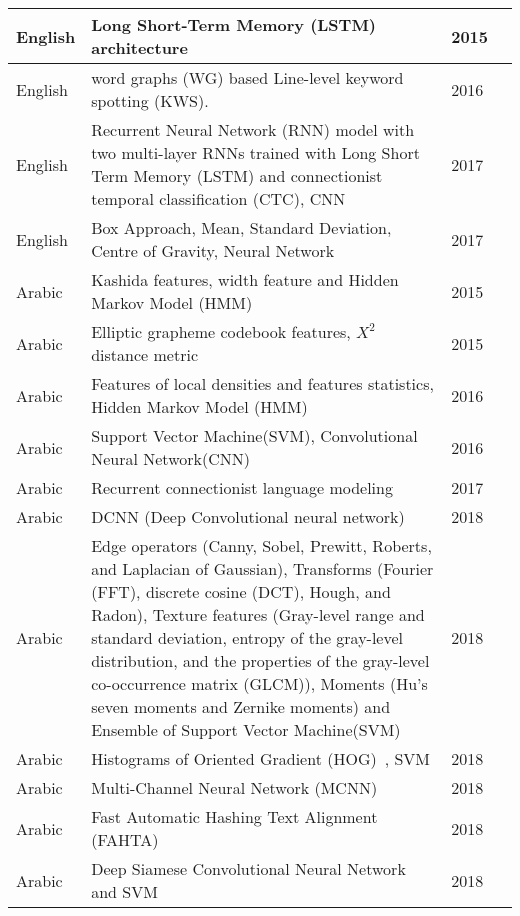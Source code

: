 \documentclass{article}
\begin{document}
\begin{landscape}
\begin{longtable}{| p{1.5cm} | p{16cm}| p{1.5cm}| p{1cm}|}
English & Long Short-Term Memory (LSTM) architecture & 2015 & \cite{gregor2015draw}\\ \hline


English & word graphs (WG) based Line-level keyword spotting (KWS). & 2016 & \cite{toselli2016hmm}\\ \hline


English & Recurrent Neural Network (RNN)  model with two multi-layer RNNs trained with Long Short Term Memory (LSTM) and connectionist temporal classification (CTC), CNN & 2017 & \cite{su2017accurate}\\ \hline
English & Box Approach, Mean, Standard Deviation, Centre of Gravity, Neural Network & 2017 & \cite{ahlawat2017off}\\ \hline


Arabic & Kashida features, width feature and Hidden Markov Model (HMM) & 2015 & \cite{elarian2015arabic}\\ \hline
Arabic & Elliptic grapheme codebook features, $X^2$ distance metric & 2015 & \cite{abdi2015model}\\ \hline
Arabic & Features of local densities and features statistics, Hidden Markov Model (HMM) & 2016 & \cite{akram2016using}\\ \hline
Arabic & Support Vector Machine(SVM), Convolutional Neural Network(CNN) & 2016 & \cite{elleuch2016new}\\ \hline
Arabic & Recurrent connectionist language modeling 	 &2017 &\cite{yousfi2017contribution}\\ \hline

Arabic & DCNN (Deep Convolutional neural network) & 2018 & \cite{boufenar2018investigation}\\ \hline

Arabic & Edge operators (Canny, Sobel, Prewitt, Roberts, and Laplacian of Gaussian), Transforms (Fourier (FFT), discrete cosine (DCT), Hough, and Radon), Texture features (Gray-level range and standard deviation, entropy of the gray-level distribution, and the properties of the gray-level co-occurrence matrix (GLCM)), Moments (Hu’s seven moments and Zernike moments) and Ensemble of Support Vector Machine(SVM) & 2018 & \cite{elanwar2018making}\\ \hline

Arabic & Histograms of Oriented Gradient (HOG) , SVM & 2018 & \cite{jebril2018recognition}\\ \hline
Arabic & Multi-Channel Neural Network (MCNN) & 2018 & \cite{radwan2018neural}\\ \hline
Arabic & Fast Automatic Hashing Text Alignment (FAHTA) &2018 & \cite{doush2018novel}\\ \hline
Arabic & Deep Siamese Convolutional Neural Network and SVM & 2018 & \cite{sokar2018generic}\\ \hline





\end{longtable}
\end{landscape}
\end{document}
